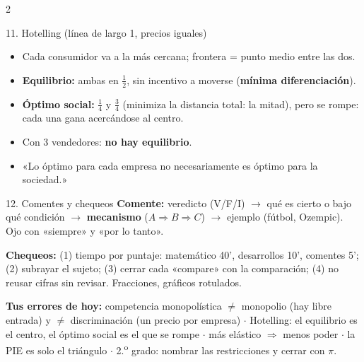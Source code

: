 \documentclass[10pt]{article}
\begin{document}
\begin{multicols}{2}
\begin{caja}{11. Hotelling (línea de largo 1, precios iguales)}
\begin{itemize}
\item Cada consumidor va a la más cercana; frontera = punto medio entre las dos.
\item \textbf{Equilibrio:} ambas en $\tfrac12$, sin incentivo a moverse (\textbf{mínima diferenciación}).
\item \textbf{Óptimo social:} $\tfrac14$ y $\tfrac34$ (minimiza la distancia total: la mitad), pero se rompe: cada una gana acercándose al centro.
\item Con 3 vendedores: \textbf{no hay equilibrio}.
\item «Lo óptimo para cada empresa no necesariamente es óptimo para la sociedad.»
\end{itemize}
\end{caja}

\begin{caja}{12. Comentes y chequeos}
\textbf{Comente:} veredicto (V/F/I) $\to$ qué es cierto o bajo qué condición $\to$ \textbf{mecanismo} ($A \Rightarrow B \Rightarrow C$) $\to$ ejemplo (fútbol, Ozempic). Ojo con «siempre» y «por lo tanto».

\textbf{Chequeos:} (1) tiempo por puntaje: matemático 40', desarrollos 10', comentes 5'; (2) subrayar el sujeto; (3) cerrar cada «compare» con la comparación; (4) no reusar cifras sin revisar. Fracciones, gráficos rotulados.
\end{caja}

\begin{trampa}
\small\textbf{Tus errores de hoy:} competencia monopolística $\neq$ monopolio (hay libre entrada) y $\neq$ discriminación (un precio por empresa) $\cdot$ Hotelling: el equilibrio es el centro, el óptimo social es el que se rompe $\cdot$ más elástico $\Rightarrow$ menos poder $\cdot$ la PIE es solo el triángulo $\cdot$ 2.\textsuperscript{o} grado: nombrar las restricciones y cerrar con $\pi$.
\end{trampa}

\end{multicols}
\end{document}
